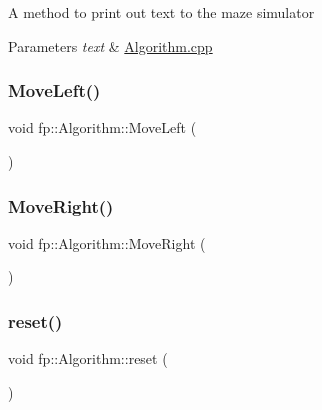 A method to print out text to the maze simulator 
\begin{DoxyParams}{Parameters}
{\em text} & \hyperlink{_algorithm_8cpp}{Algorithm.\+cpp} \\
\hline
\end{DoxyParams}
\mbox{\label{classfp_1_1_algorithm_aaa34202f81b3b971590cc7608f0665df}} 
\subsubsection{\texorpdfstring{Move\+Left()}{MoveLeft()}}
{\footnotesize\ttfamily void fp\+::\+Algorithm\+::\+Move\+Left (\begin{DoxyParamCaption}{ }\end{DoxyParamCaption})\hspace{0.3cm}{\ttfamily [protected]}}

\mbox{\label{classfp_1_1_algorithm_a038bec51ce281896e229908b0822b749}} 
\subsubsection{\texorpdfstring{Move\+Right()}{MoveRight()}}
{\footnotesize\ttfamily void fp\+::\+Algorithm\+::\+Move\+Right (\begin{DoxyParamCaption}{ }\end{DoxyParamCaption})\hspace{0.3cm}{\ttfamily [protected]}}

\mbox{\label{classfp_1_1_algorithm_a182de09af3489ef37ea0fd4a4baeacbc}} 
\subsubsection{\texorpdfstring{reset()}{reset()}}
{\footnotesize\ttfamily void fp\+::\+Algorithm\+::reset (\begin{DoxyParamCaption}{ }\end{DoxyParamCaption})}

